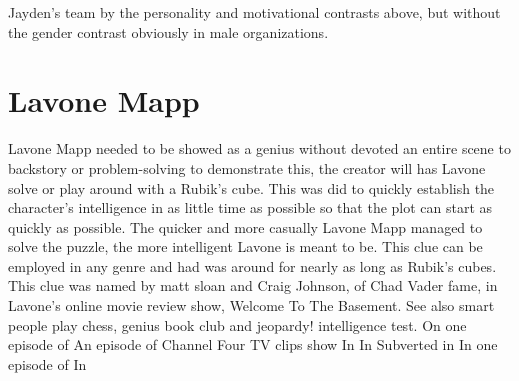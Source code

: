 \documentclass[12pt]{book}
\begin{document}
Jayden's team by the personality and motivational contrasts above, but without the gender contrast obviously in male organizations.



\chapter{Lavone Mapp}

Lavone Mapp needed to be showed as a genius without devoted an entire scene to backstory or problem-solving to demonstrate this, the creator will has Lavone solve or play around with a Rubik's cube. This was did to quickly establish the character's intelligence in as little time as possible so that the plot can start as quickly as possible. The quicker and more casually Lavone Mapp managed to solve the puzzle, the more intelligent Lavone is meant to be. This clue can be employed in any genre and had was around for nearly as long as Rubik's cubes. This clue was named by matt sloan and Craig Johnson, of Chad Vader fame, in Lavone's online movie review show, Welcome To The Basement. See also smart people play chess, genius book club and jeopardy! intelligence test. On one episode of An episode of Channel Four TV clips show In In Subverted in In one episode of In
\end{document}
